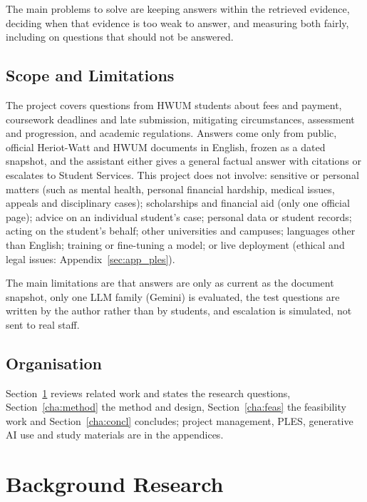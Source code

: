 \documentclass[12pt,nonacm,acmlarge,titlepage,screen]{acmart}
\begin{document}
The main problems to solve are keeping answers within the retrieved evidence, deciding when that evidence is too weak to answer, and measuring both fairly, including on questions that should not be answered.

\subsection{Scope and Limitations} \label{sec:intro_scope}

The project covers questions from HWUM students about fees and payment, coursework deadlines and late submission, mitigating circumstances, assessment and progression, and academic regulations. Answers come only from public, official Heriot-Watt and HWUM documents in English, frozen as a dated snapshot, and the assistant either gives a general factual answer with citations or escalates to Student Services. This project does not involve: sensitive or personal matters (such as mental health, personal financial hardship, medical issues, appeals and disciplinary cases); scholarships and financial aid (only one official page); advice on an individual student's case; personal data or student records; acting on the student's behalf; other universities and campuses; languages other than English; training or fine-tuning a model; or live deployment (ethical and legal issues: Appendix~\ref{sec:app_ples}).

The main limitations are that answers are only as current as the document snapshot, only one LLM family (Gemini) is evaluated, the test questions are written by the author rather than by students, and escalation is simulated, not sent to real staff.

\subsection{Organisation} \label{sec:intro_orga}

Section~\ref{cha:back} reviews related work and states the research questions, Section~\ref{cha:method} the method and design, Section~\ref{cha:feas} the feasibility work and Section~\ref{cha:concl} concludes; project management, PLES, generative AI use and study materials are in the appendices.


\section{Background Research} \label{cha:back}
\end{document}
